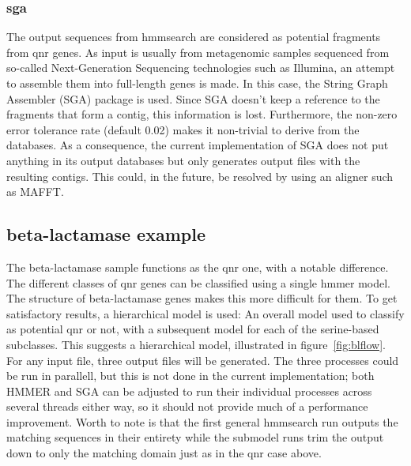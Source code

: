 \documentclass[a4paper,12pt]{article}
\begin{document}
\subsubsection{sga}
The output sequences from hmmsearch are considered as potential fragments from qnr genes. As input is usually from metagenomic samples sequenced from so-called Next-Generation Sequencing technologies such as Illumina, an attempt to assemble them into full-length genes is made. In this case, the String Graph Assembler (SGA) package is used. Since SGA doesn't keep a reference to the fragments that form a contig, this information is lost. Furthermore, the non-zero error tolerance rate (default 0.02) makes it non-trivial to derive from the databases. As a consequence, the current implementation of SGA does not put anything in its output databases but only generates output files with the resulting contigs. This could, in the future, be resolved by using an aligner such as MAFFT.

\subsection{beta-lactamase example}
The beta-lactamase sample functions as the qnr one, with a notable difference. The different classes of qnr genes can be classified using a single hmmer model. The structure of beta-lactamase genes makes this more difficult for them. To get satisfactory results, a hierarchical model is used: An overall model used to classify as potential qnr or not, with a subsequent model for each of the serine-based subclasses. This suggests a hierarchical model, illustrated in figure~\ref{fig:blflow}.
For any input file, three output files will be generated. The three processes could be run in parallell, but this is not done in the current implementation; both HMMER and SGA can be adjusted to run their individual processes across several threads either way, so it should not provide much of a performance improvement. Worth to note is that the first general hmmsearch run outputs the matching sequences in their entirety while the submodel runs trim the output down to only the matching domain just as in the qnr case above.
\end{document}
